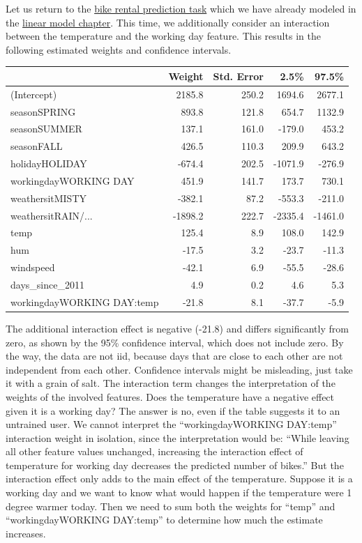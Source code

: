 \documentclass[
  11pt,
]{scrbook}
\begin{document}
Let us return to the \protect\hyperlink{bike-data}{bike rental prediction task} which we have already modeled in the \protect\hyperlink{limo}{linear model chapter}.
This time, we additionally consider an interaction between the temperature and the working day feature.
This results in the following estimated weights and confidence intervals.

\begin{table}
\centering
\begin{tabular}{>{\raggedright\arraybackslash}p{4.1cm}rrrr}
\toprule
  & Weight & Std. Error & 2.5\% & 97.5\%\\
\midrule
(Intercept) & 2185.8 & 250.2 & 1694.6 & 2677.1\\
seasonSPRING & 893.8 & 121.8 & 654.7 & 1132.9\\
seasonSUMMER & 137.1 & 161.0 & -179.0 & 453.2\\
seasonFALL & 426.5 & 110.3 & 209.9 & 643.2\\
holidayHOLIDAY & -674.4 & 202.5 & -1071.9 & -276.9\\
\addlinespace
workingdayWORKING DAY & 451.9 & 141.7 & 173.7 & 730.1\\
weathersitMISTY & -382.1 & 87.2 & -553.3 & -211.0\\
weathersitRAIN/... & -1898.2 & 222.7 & -2335.4 & -1461.0\\
temp & 125.4 & 8.9 & 108.0 & 142.9\\
hum & -17.5 & 3.2 & -23.7 & -11.3\\
\addlinespace
windspeed & -42.1 & 6.9 & -55.5 & -28.6\\
days\_since\_2011 & 4.9 & 0.2 & 4.6 & 5.3\\
workingdayWORKING DAY:temp & -21.8 & 8.1 & -37.7 & -5.9\\
\bottomrule
\end{tabular}
\end{table}

The additional interaction effect is negative (-21.8) and differs significantly from zero, as shown by the 95\% confidence interval, which does not include zero.
By the way, the data are not iid, because days that are close to each other are not independent from each other.
Confidence intervals might be misleading, just take it with a grain of salt.
The interaction term changes the interpretation of the weights of the involved features.
Does the temperature have a negative effect given it is a working day?
The answer is no, even if the table suggests it to an untrained user.
We cannot interpret the ``workingdayWORKING DAY:temp'' interaction weight in isolation, since the interpretation would be:
``While leaving all other feature values unchanged, increasing the interaction effect of temperature for working day decreases the predicted number of bikes.''
But the interaction effect only adds to the main effect of the temperature.
Suppose it is a working day and we want to know what would happen if the temperature were 1 degree warmer today.
Then we need to sum both the weights for ``temp'' and ``workingdayWORKING DAY:temp'' to determine how much the estimate increases.
\end{document}
